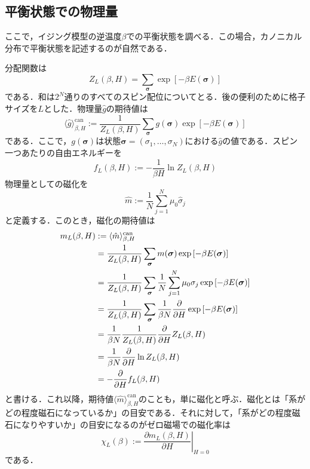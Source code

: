 \documentclass[a4paper,11pt]{jsreport}
\begin{document}
\subsection{平衡状態での物理量}
ここで，イジング模型の逆温度$\beta$での平衡状態を調べる．この場合，カノニカル分布で平衡状態を記述するのが自然である．\par
分配関数は
\begin{equation}
  Z_L(\beta, H) = \sum_{\bm{\sigma}} \exp{[-\beta E(\bm{\sigma})]} \label{イジング分配関数}
\end{equation}
である．和は$2^N$通りのすべてのスピン配位についてとる．後の便利のために格子サイズを$L$とした．物理量$\hat{g}$の期待値は
\begin{equation}
  \langle \hat{g} \rangle_{\beta, H}^{\text{can}}
  := \frac{1}{Z_L(\beta, H)}  \sum_{\bm{\sigma}} g(\bm{\sigma}) \exp{[-\beta E(\bm{\sigma})]}
\end{equation}
である．ここで，$g(\bm{\sigma})$は状態$\bm{\sigma}=(\sigma_1,\dots,\sigma_N)$における$\hat{g}$の値である．スピン一つあたりの自由エネルギーを
\begin{equation}
  f_L(\beta, H) := -\frac{1}{\beta H} \ln{Z_L(\beta, H)} \label{自由エネルギー}
\end{equation}
物理量としての磁化を
\begin{equation}
  \hat{m} := \frac{1}{N} \sum_{j=1}^{N} \mu_0 \hat{\sigma}_j
\end{equation}
と定義する．このとき，磁化の期待値は
\begin{align}
   m_L(\beta, H) &:= \langle \hat{m} \rangle_{\beta, H}^{\text{can}} \notag                                                                                       \\
   & = \frac{1}{Z_L(\beta, H)} \sum_{\bm{\sigma}} m(\bm{\sigma}) \exp{[-\beta E(\bm{\sigma})]} \notag                \\
   & = \frac{1}{Z_L(\beta, H)} \sum_{\bm{\sigma}} \frac{1}{N} \sum_{j=1}^N \mu_0 \sigma_j \exp{[-\beta E(\bm{\sigma})]} \notag      \\
   & = \frac{1}{Z_L(\beta, H)} \sum_{\bm{\sigma}} \frac{1}{\beta N} \frac{\partial}{\partial H} \exp{[-\beta E(\bm{\sigma})]}\notag \\
   & = \frac{1}{\beta N} \frac{1}{Z_L(\beta, H)} \frac{\partial}{\partial H} Z_L(\beta, H)  \notag                                                                 \\
   & = \frac{1}{\beta N}\frac{\partial}{\partial H} \ln{Z_L (\beta, H)} \notag                                                                                     \\
   & = -\frac{\partial}{\partial H} f_L(\beta, H) \label{磁化と自由エネルギーの関係式}
\end{align}
と書ける．これ以降，期待値$\langle \hat{m} \rangle_{\beta, H}^{\text{can}}$のことも，単に磁化と呼ぶ．磁化とは「系がどの程度磁石になっているか」の目安である．それに対して，「系がどの程度磁石になりやすいか」の目安になるのがゼロ磁場での磁化率は
\begin{equation}
  \chi_L(\beta) := \left.\frac{\partial m_L(\beta, H)}{\partial H}\right|_{H=0}
\end{equation}
である．
\end{document}
